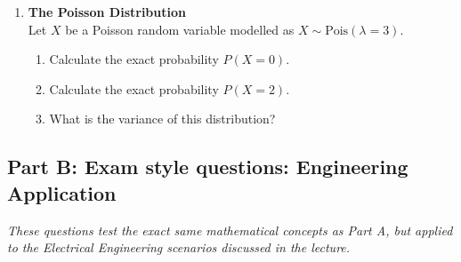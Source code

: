 \begin{enumerate}[label=\textbf{Q\arabic*.}, leftmargin=*]
    \item \textbf{The Poisson Distribution} \\
    Let $X$ be a Poisson random variable modelled as $X \sim \text{Pois}(\lambda=3)$.
    \begin{enumerate}[label=\arabic*.]
        \item Calculate the exact probability $P(X = 0)$.
        \item Calculate the exact probability $P(X = 2)$.
        \item What is the variance of this distribution? 
    \end{enumerate}

\end{enumerate}

\vspace{0.8cm}

\subsection*{Part B: Exam style questions: Engineering Application}
\textit{These questions test the exact same mathematical concepts as Part A, but applied to the Electrical Engineering scenarios discussed in the lecture.}

